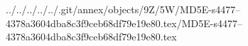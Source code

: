 ../../../../../.git/annex/objects/9Z/5W/MD5E-s4477--4378a3604dba8c3f9ceb68df79e19e80.tex/MD5E-s4477--4378a3604dba8c3f9ceb68df79e19e80.tex